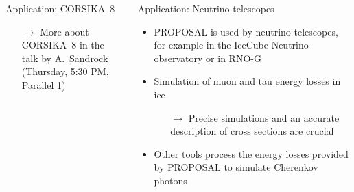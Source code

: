 \documentclass[t]{beamer}
\newlength{\thirdtextwidth}
\newlength{\itemseparation}
\begin{document}
\begin{columns}[onlytextwidth]
\begin{column}{\thirdtextwidth}
\begin{block}[equal height group=B]{Application: CORSIKA~8}
              \begin{center}
                \colorbox{light-gray}{
                  \begin{minipage}{0.80\linewidth}
                    \begin{itemize}
                      \item[\textcolor{tugreen}{$\rightarrow$}] More about CORSIKA~8 in the talk by A.~Sandrock \\(Thursday, 5:30 PM, Parallel 1)
                    \end{itemize}
                  \end{minipage}
                }
              \end{center}


      \end{block}%
    \end{column}%
    \begin{column}{\thirdtextwidth}%
      \begin{block}[equal height group=B]{Application: Neutrino telescopes}%
        \begin{itemize}
          \setlength\itemsep{\itemseparation}
          \item PROPOSAL is used by neutrino telescopes, for example in the IceCube Neutrino observatory or in RNO-G
          \item Simulation of muon and tau energy losses in ice
          \begin{itemize}
            \setlength\itemsep{\itemseparation}
            \item[$\rightarrow$] Precise simulations and an accurate description of cross sections are crucial
          \end{itemize}
          \item Other tools process the energy losses provided by PROPOSAL to simulate Cherenkov photons
        \end{itemize}

        \vspace{1.75em}


\end{block}
\end{column}
\end{columns}
\end{document}
